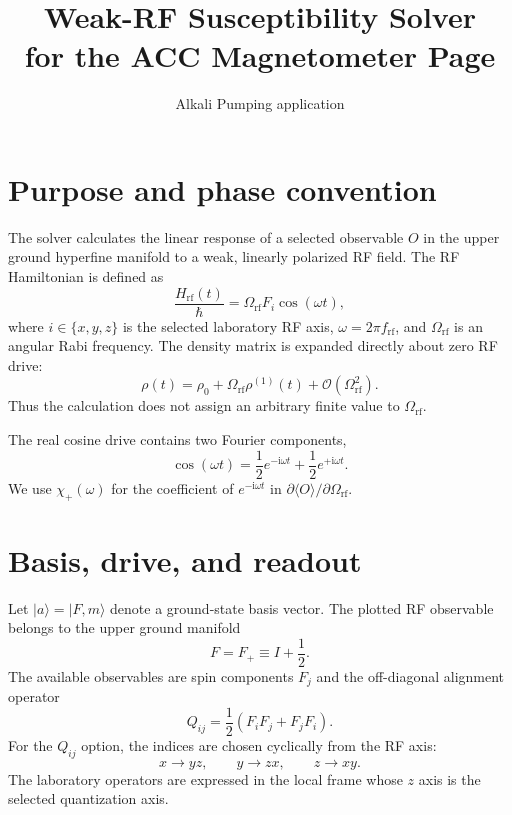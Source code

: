\documentclass[11pt]{article}
\title{Weak-RF Susceptibility Solver\\for the ACC Magnetometer Page}
\author{Alkali Pumping application}
\date{}
\newcommand{\ii}{\mathrm{i}}
\newcommand{\Omrf}{\Omega_{\mathrm{rf}}}
\begin{document}
\maketitle

\section{Purpose and phase convention}

The solver calculates the linear response of a selected observable $O$ in the
upper ground hyperfine manifold to a weak, linearly polarized RF field.  The
RF Hamiltonian is defined as
\begin{equation}
  \frac{H_{\mathrm{rf}}(t)}{\hbar}
  =\Omrf F_i\cos(\omega t),
  \label{eq:rf-hamiltonian}
\end{equation}
where $i\in\{x,y,z\}$ is the selected laboratory RF axis,
$\omega=2\pi f_{\mathrm{rf}}$, and $\Omrf$ is an angular Rabi frequency.
The density matrix is expanded directly about zero RF drive:
\begin{equation}
  \rho(t)=\rho_0+\Omrf\rho^{(1)}(t)+\mathcal O(\Omrf^2).
\end{equation}
Thus the calculation does not assign an arbitrary finite value to
$\Omrf$.

The real cosine drive contains two Fourier components,
\begin{equation}
  \cos(\omega t)=\frac12e^{-\ii\omega t}+\frac12e^{+\ii\omega t}.
\end{equation}
We use $\chi_+(\omega)$ for the coefficient of $e^{-\ii\omega t}$ in
$\partial\langle O\rangle/\partial\Omrf$.

\section{Basis, drive, and readout}

Let $|a\rangle=|F,m\rangle$ denote a ground-state basis vector.  The plotted
RF observable belongs to the upper ground manifold
\begin{equation}
  F=F_+\equiv I+\frac12.
\end{equation}
The available observables are spin components $F_j$ and the off-diagonal
alignment operator
\begin{equation}
  Q_{ij}=\frac12(F_iF_j+F_jF_i).
\end{equation}
For the $Q_{ij}$ option, the indices are chosen cyclically from the RF axis:
\begin{equation}
  x\rightarrow yz,\qquad y\rightarrow zx,\qquad z\rightarrow xy.
\end{equation}
The laboratory operators are expressed in the local frame whose $z$ axis is
the selected quantization axis.
\end{document}
